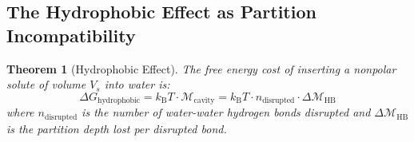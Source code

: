 \documentclass[twocolumn,10pt]{article}
\newtheorem{theorem}{Theorem}[section]
\theoremstyle{remark}
\newcommand{\kB}{k_{\mathrm{B}}}
\newcommand{\Depth}{\mathcal{M}}
\begin{document}
\subsection{The Hydrophobic Effect as Partition Incompatibility}

\begin{theorem}[Hydrophobic Effect]
\label{thm:hydrophobic}
The free energy cost of inserting a nonpolar solute of volume $V_s$ into water is:
\begin{equation}
    \Delta G_{\text{hydrophobic}} = \kB T \cdot \Depth_{\text{cavity}} = \kB T \cdot n_{\text{disrupted}} \cdot \Delta\Depth_{\text{HB}}
\end{equation}
where $n_{\text{disrupted}}$ is the number of water-water hydrogen bonds disrupted and $\Delta\Depth_{\text{HB}}$ is the partition depth lost per disrupted bond.
\end{theorem}
\end{document}
